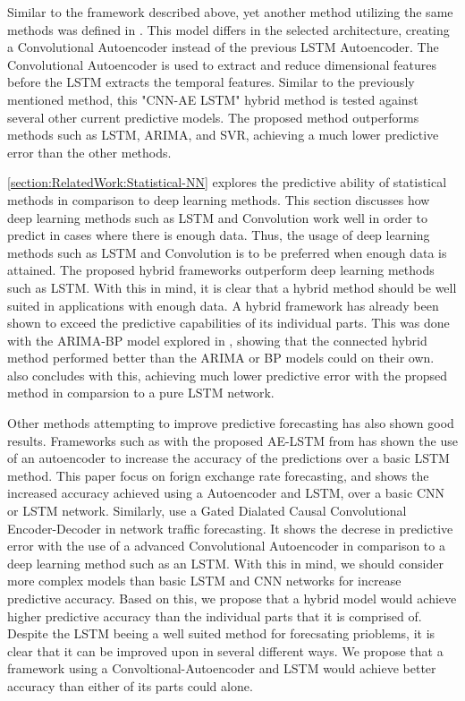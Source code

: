 Similar to the framework described above, yet another method utilizing the same methods was defined in \cite{Zhao2019}.
This model differs in the selected architecture, creating a Convolutional Autoencoder instead of the previous LSTM Autoencoder.
The Convolutional Autoencoder is used to extract and reduce dimensional features before the LSTM extracts the temporal features.
Similar to the previously mentioned method, this "CNN-AE LSTM" hybrid method is tested against several other current predictive models.
The proposed method outperforms methods such as LSTM, ARIMA, and SVR, achieving a much lower predictive error than the other methods.


\ref{section:RelatedWork:Statistical-NN} explores the predictive ability of statistical methods in comparison to deep learning methods.
This section discusses how deep learning methods such as LSTM and Convolution work well in order to predict in cases where there is enough data.
Thus, the usage of deep learning methods such as LSTM and Convolution is to be preferred when enough data is attained.
The proposed hybrid frameworks outperform deep learning methods such as LSTM.
With this in mind, it is clear that a hybrid method should be well suited in applications with enough data.
A hybrid framework has already been shown to exceed the predictive capabilities of its individual parts.
This was done with the ARIMA-BP model explored in \cite{Bowen2020}, showing that the connected hybrid method performed better than the ARIMA or BP models could on their own.
\cite{Zhao2019} also concludes with this, achieving much lower predictive error with the propsed method in comparsion to a pure LSTM network.

Other methods attempting to improve predictive forecasting has also shown good results.
Frameworks such as with the proposed AE-LSTM from \cite{VanHoa2021} has shown the use of an autoencoder to increase the accuracy of the predictions over a basic LSTM method.
This paper focus on forign exchange rate forecasting, and shows the increased accuracy achieved using a Autoencoder and LSTM, over a basic CNN or LSTM network.
Similarly, \cite{Zhang2020} use a Gated Dialated Causal Convolutional Encoder-Decoder in network traffic forecasting.
It shows the decrese in predictive error with the use of a advanced Convolutional Autoencoder in comparison to a deep learning method such as an LSTM.
With this in mind, we should consider more complex models than basic LSTM and CNN networks for increase predictive accuracy.
Based on this, we propose that a hybrid model would achieve higher predictive accuracy than the individual parts that it is comprised of.
Despite the LSTM beeing a well suited method for forecsating prioblems, it is clear that it can be improved upon in several different ways.
We propose that a framework using a Convoltional-Autoencoder and LSTM would achieve better accuracy than either of its parts could alone.

